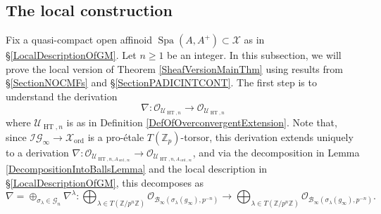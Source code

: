 \documentclass[10pt, oneside]{amsart}
\numberwithin{equation}{subsection}
\theoremstyle{definition}
\theoremstyle{remark}
\newcommand{\mbb}[1]{\mathbb{#1}}
\newcommand{\opn}[1]{\operatorname{#1}}
\begin{document}
\subsection{The local construction} \label{LocalConstructionOfGMsubsec}

Fix a quasi-compact open affinoid $\opn{Spa}(A, A^+) \subset \mathcal{X}$ as in \S \ref{LocalDescriptionOfGM}. Let $n \geq 1$ be an integer. In this subsection, we will prove the local version of Theorem \ref{SheafVersionMainThm} using results from \S \ref{SectionNOCMFs} and \S \ref{SectionPADICINTCONT}. The first step is to understand the derivation 
\[
\nabla \colon \mathcal{O}_{\mathcal{U}_{\opn{HT}, n}} \to \mathcal{O}_{\mathcal{U}_{\opn{HT}, n}} 
\]
where $\mathcal{U}_{\opn{HT}, n}$ is as in Definition \ref{DefOfOverconvergentExtension}. Note that, since $\mathcal{IG}_{\infty} \to \mathcal{X}_{\opn{ord}}$ is a pro-\'{e}tale $T(\mbb{Z}_p)$-torsor, this derivation extends uniquely to a derivation $\nabla \colon \mathcal{O}_{\mathcal{U}_{\opn{HT}, n, A_{\opn{ord}, \infty}}} \to \mathcal{O}_{\mathcal{U}_{\opn{HT}, n, A_{\opn{ord}, \infty}}}$, and via the decomposition in Lemma \ref{DecompositionIntoBallsLemma} and the local description in \S \ref{LocalDescriptionOfGM}, this decomposes as
\[
\nabla = \oplus_{\sigma_{\lambda} \in \mathscr{G}_n} \nabla^{\lambda} \colon \bigoplus_{\lambda \in T(\mbb{Z}/p^n \mbb{Z})} \mathcal{O}_{\mathcal{B}_{\infty}(\sigma_{\lambda}(g_\infty), p^{-n})} \to \bigoplus_{\lambda \in T(\mbb{Z}/p^n \mbb{Z})} \mathcal{O}_{\mathcal{B}_{\infty}(\sigma_{\lambda}(g_\infty), p^{-n})} .
\]
\end{document}

